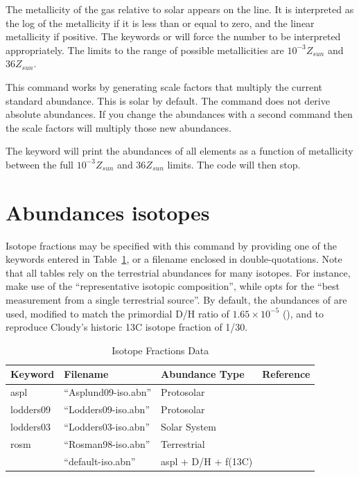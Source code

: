 The metallicity of the gas relative to solar appears on the line.
It is interpreted as the log of the metallicity if it is
less than or equal
to zero, and the linear metallicity if positive.
The keywords
 or 
will force the number to be interpreted appropriately.
The limits to the
range of possible metallicities are $10^{-3} Z_{sun}$ and $36 Z_{sun}$.

This command works by generating scale factors that multiply
the current standard abundance.
This is solar by default.
The command does not derive
absolute abundances.
If you change the abundances with a second
command then the scale factors will multiply those new abundances.

The keyword  will print the abundances of
all elements as a function
of metallicity between the full $10^{-3} Z_{sun}$ and
$36 Z_{sun}$ limits.
The code will then stop.

\section{Abundances isotopes}

Isotope fractions may be specified with this command by providing
one of the keywords entered in Table~\ref{tab:isotopes}, or a
filename enclosed in double-quotations.
Note that all tables rely on the \citet{Rosman1998}
terrestrial abundances for many isotopes.
For instance, \citet{Asplund2009} make use of the
``representative isotopic composition'', while \citet{Lodders2003}
opts for the ``best measurement from a single terrestrial source''.
By default, the abundances of \citet{Asplund2009} are used,
modified to match the primordial D/H ratio of $1.65 \times 10^{-5}$
(\citealp{Pettini2001}), and to reproduce Cloudy's historic 13C isotope
fraction of 1/30.

\begin{table}
\centering
\caption{Isotope Fractions Data}
\label{tab:isotopes}
\begin{tabular}{llll}
\hline
Keyword		& Filename		& Abundance Type	&	Reference		\\
\hline
aspl		& ``Asplund09-iso.abn''	& Protosolar		&	\citet{Asplund2009}	\\
lodders09	& ``Lodders09-iso.abn''	& Protosolar		&	\citet{Lodders2009}	\\
lodders03	& ``Lodders03-iso.abn''	& Solar System		&	\citet{Lodders2003}	\\
rosm		& ``Rosman98-iso.abn''	& Terrestrial 		&	\citet{Rosman1998}	\\
    		& ``default-iso.abn''	& aspl + D/H + f(13C)	&				\\
\hline
\end{tabular}
\end{table}

